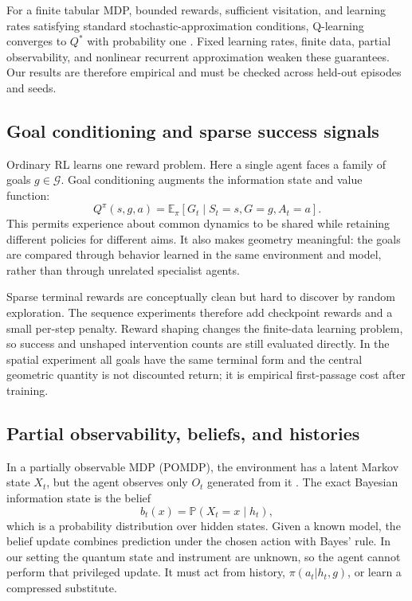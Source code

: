 \documentclass[11pt]{article}
\newcommand{\E}{\mathbb E}
\newcommand{\Prob}{\mathbb P}
\begin{document}
For a finite tabular MDP, bounded rewards, sufficient visitation, and learning
rates satisfying standard stochastic-approximation conditions, Q-learning
converges to $Q^*$ with probability one \cite{watkins1992}. Fixed learning
rates, finite data, partial observability, and nonlinear recurrent
approximation weaken these guarantees. Our results are therefore empirical and
must be checked across held-out episodes and seeds.

\subsection{Goal conditioning and sparse success signals}

Ordinary RL learns one reward problem. Here a single agent faces a family of
goals $g\in\mathcal G$. Goal conditioning augments the information state and
value function:
\begin{equation}
 Q^\pi(s,g,a)=\E_\pi[G_t\mid S_t=s,G=g,A_t=a].
 \label{eq:goal-conditioned-q}
\end{equation}
This permits experience about common dynamics to be shared while retaining
different policies for different aims. It also makes geometry meaningful: the
goals are compared through behavior learned in the same environment and model,
rather than through unrelated specialist agents.

Sparse terminal rewards are conceptually clean but hard to discover by random
exploration. The sequence experiments therefore add checkpoint rewards and a
small per-step penalty. Reward shaping changes the finite-data learning
problem, so success and unshaped intervention counts are still evaluated
directly. In the spatial experiment all goals have the same terminal form and
the central geometric quantity is not discounted return; it is empirical
first-passage cost after training.

\subsection{Partial observability, beliefs, and histories}

In a partially observable MDP (POMDP), the environment has a latent Markov
state $X_t$, but the agent observes only $O_t$ generated from it
\cite{kaelbling1998}. The exact Bayesian information state is the belief
\begin{equation}
 b_t(x)=\Prob(X_t=x\mid h_t),
 \label{eq:belief}
\end{equation}
which is a probability distribution over hidden states. Given a known model,
the belief update combines prediction under the chosen action with Bayes'
rule. In our setting the quantum state and instrument are unknown, so the agent
cannot perform that privileged update. It must act from history,
$\pi(a_t|h_t,g)$, or learn a compressed substitute.
\end{document}
